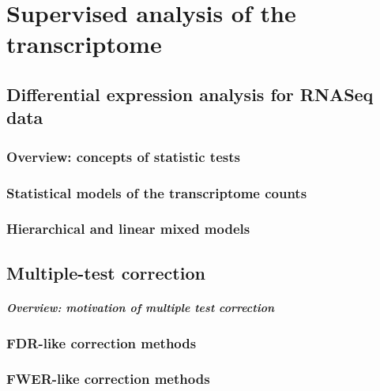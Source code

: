\chapter{Supervised analysis of the transcriptome}

\section{Differential expression analysis for RNASeq data}
\subsection{Overview: concepts of statistic tests}
\subsection{Statistical models of the transcriptome counts}
\subsection{Hierarchical and linear mixed models}




\section{Multiple-test correction}
\paragraph{Overview: motivation of multiple test correction}
\subsection{FDR-like correction methods}
\subsection{FWER-like correction methods}

